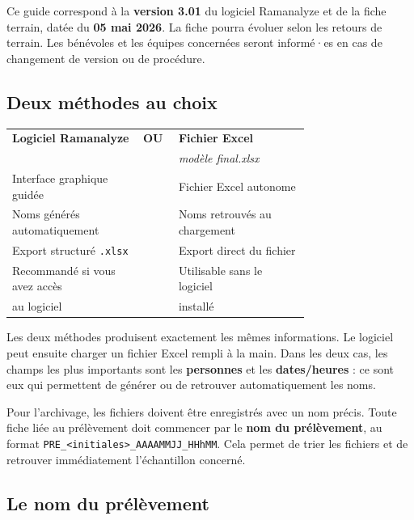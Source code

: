 \documentclass[12pt, a4paper]{article}
\begin{document}
\begin{attention}
  Ce guide correspond à la \textbf{version 3.01} du logiciel Ramanalyze
  et de la fiche terrain, datée du \textbf{05 mai 2026}. La fiche pourra
  évoluer selon les retours de terrain. Les bénévoles et les équipes
  concernées seront informé·es en cas de changement de version ou de
  procédure.
\end{attention}

\subsection{Deux méthodes au choix}

\begin{center}
{\small
\begin{tabularx}{0.9\linewidth}{C{0.34\linewidth} C{0.05\linewidth} C{0.34\linewidth}}
  \toprule
  \textbf{Logiciel Ramanalyze} & \textbf{OU} & \textbf{Fichier Excel} \\
  & & \textit{modèle final.xlsx} \\
  \midrule
  Interface graphique guidée & & Fichier Excel autonome \\
  Noms générés automatiquement & & Noms retrouvés au chargement \\
  Export structuré \texttt{.xlsx} & & Export direct du fichier \\
  Recommandé si vous avez accès & & Utilisable sans le logiciel \\
  au logiciel & & installé \\
  \bottomrule
\end{tabularx}
}
\end{center}

Les deux méthodes produisent exactement les mêmes informations.
Le logiciel peut ensuite charger un fichier Excel rempli à la main.
Dans les deux cas, les champs les plus importants sont les
\textbf{personnes} et les \textbf{dates/heures} : ce sont eux qui
permettent de générer ou de retrouver automatiquement les noms.

\begin{important}
  Pour l'archivage, les fichiers doivent être enregistrés avec un
  nom précis. Toute fiche liée au prélèvement doit commencer par le
  \textbf{nom du prélèvement}, au format
  \texttt{PRE\_<initiales>\_AAAAMMJJ\_HHhMM}. Cela permet de trier
  les fichiers et de retrouver immédiatement l'échantillon concerné.
\end{important}

\subsection{Le nom du prélèvement}
\end{document}
